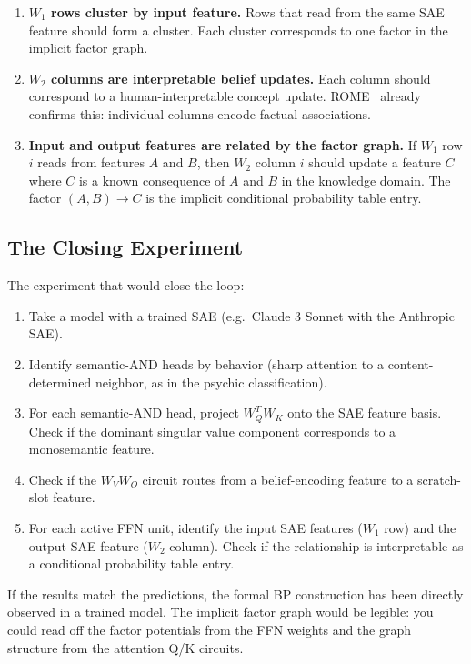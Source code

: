 \begin{enumerate}
\item \textbf{$W_1$ rows cluster by input feature.} Rows that read from the
same SAE feature should form a cluster. Each cluster corresponds to one factor
in the implicit factor graph.

\item \textbf{$W_2$ columns are interpretable belief updates.} Each column
should correspond to a human-interpretable concept update. ROME~\cite{meng2022rome}
already confirms this: individual columns encode factual associations.

\item \textbf{Input and output features are related by the factor graph.}
If $W_1$ row $i$ reads from features $A$ and $B$, then $W_2$ column $i$ should
update a feature $C$ where $C$ is a known consequence of $A$ and $B$ in the
knowledge domain. The factor $(A, B) \to C$ is the implicit conditional
probability table entry.
\end{enumerate}

\subsection*{The Closing Experiment}

The experiment that would close the loop:

\begin{enumerate}
\item Take a model with a trained SAE (e.g.\ Claude 3 Sonnet with the
Anthropic SAE).
\item Identify semantic-AND heads by behavior (sharp attention to a
content-determined neighbor, as in the psychic classification).
\item For each semantic-AND head, project $W_Q^T W_K$ onto the SAE feature
basis. Check if the dominant singular value component corresponds to a
monosemantic feature.
\item Check if the $W_V W_O$ circuit routes from a belief-encoding feature
to a scratch-slot feature.
\item For each active FFN unit, identify the input SAE features ($W_1$ row)
and the output SAE feature ($W_2$ column). Check if the relationship is
interpretable as a conditional probability table entry.
\end{enumerate}

If the results match the predictions, the formal BP construction has been
directly observed in a trained model. The implicit factor graph would be
legible: you could read off the factor potentials from the FFN weights and
the graph structure from the attention Q/K circuits.

